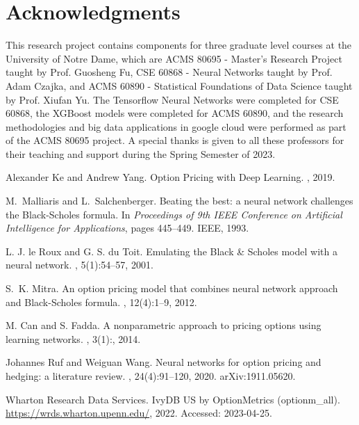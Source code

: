 \documentclass[a4paper]{article}
\begin{document}
\section*{Acknowledgments}

This research project contains components for three graduate level courses at the University of Notre Dame, which are ACMS 80695 - Master's Research Project taught by Prof. Guosheng Fu, CSE 60868 - Neural Networks taught by Prof. Adam Czajka, and ACMS 60890 - Statistical Foundations of Data Science taught by Prof. Xiufan Yu. The Tensorflow Neural Networks were completed for CSE 60868, the XGBoost models were completed for ACMS 60890, and the research methodologies and big data applications in google cloud were performed as part of the ACMS 80695 project. A special thanks is given to all these professors for their teaching and support during the Spring Semester of 2023.


\begin{thebibliography}{99}

Alexander Ke and Andrew Yang.
\newblock Option Pricing with Deep Learning.
, 2019.

M.~Malliaris and L.~Salchenberger.
\newblock Beating the best: a neural network challenges the Black-Scholes formula.
\newblock In {\em Proceedings of 9th IEEE Conference on Artificial Intelligence for Applications}, pages 445--449. IEEE, 1993.

L. J. le Roux and G. S. du Toit.
\newblock Emulating the Black \& Scholes model with a neural network.
, 5(1):54--57, 2001.

S.~K. Mitra.
\newblock An option pricing model that combines neural network approach and Black-Scholes formula.
, 12(4):1--9, 2012.

M. Can and S. Fadda.
\newblock A nonparametric approach to pricing options using learning networks.
, 3(1):, 2014.

Johannes Ruf and Weiguan Wang.
\newblock Neural networks for option pricing and hedging: a literature review.
, 24(4):91--120, 2020.
\newblock arXiv:1911.05620.

Wharton Research Data Services.
\newblock IvyDB US by OptionMetrics (optionm\_all).
\newblock \url{https://wrds.wharton.upenn.edu/}, 2022.
\newblock Accessed: 2023-04-25.

\end{thebibliography}
\end{document}
